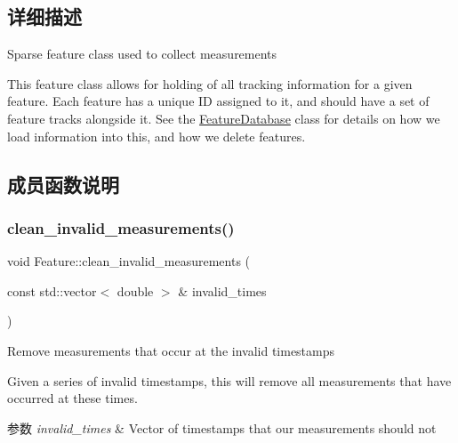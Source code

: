 \subsection{详细描述}
Sparse feature class used to collect measurements 

This feature class allows for holding of all tracking information for a given feature. Each feature has a unique ID assigned to it, and should have a set of feature tracks alongside it. See the \hyperlink{classov__core_1_1FeatureDatabase}{Feature\+Database} class for details on how we load information into this, and how we delete features. 

\subsection{成员函数说明}
\mbox{\label{classov__core_1_1Feature_a9daa91fb3836d23563bdc9aad6686ee1}} 
\subsubsection{\texorpdfstring{clean\+\_\+invalid\+\_\+measurements()}{clean\_invalid\_measurements()}}
{\footnotesize\ttfamily void Feature\+::clean\+\_\+invalid\+\_\+measurements (\begin{DoxyParamCaption}\item[{const std\+::vector$<$ double $>$ \&}]{invalid\+\_\+times }\end{DoxyParamCaption})}



Remove measurements that occur at the invalid timestamps 

Given a series of invalid timestamps, this will remove all measurements that have occurred at these times.


\begin{DoxyParams}{参数}
{\em invalid\+\_\+times} & Vector of timestamps that our measurements should not \\
\hline
\end{DoxyParams}
\mbox{\label{classov__core_1_1Feature_aee27e65f3de5581ededd30646479e315}} 

